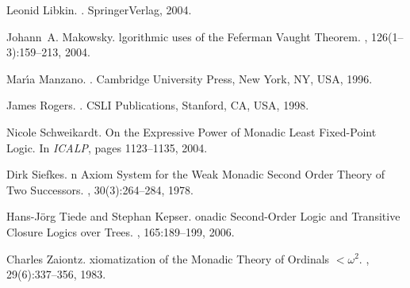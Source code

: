 \documentclass{LMCS}
\begin{document}
\begin{thebibliography}{10}
Leonid Libkin.
.
\newblock SpringerVerlag, 2004.

Johann~A. Makowsky.
lgorithmic uses of the {F}eferman {V}aught {T}heorem.
, 126(1--3):159--213, 2004.

Mar\'{\i}a Manzano.
.
\newblock Cambridge University Press, New York, NY, USA, 1996.

James Rogers.
.
\newblock CSLI Publications, Stanford, CA, USA, 1998.

Nicole Schweikardt.
\newblock On the {E}xpressive {P}ower of {M}onadic {L}east {F}ixed-{P}oint
  {L}ogic.
\newblock In {\em ICALP}, pages 1123--1135, 2004.

Dirk Siefkes.
n {A}xiom {S}ystem for the {W}eak {M}onadic {S}econd {O}rder
  {T}heory of {T}wo {S}uccessors.
, 30(3):264--284, 1978.

Hans-J\"{o}rg Tiede and Stephan Kepser.
onadic {S}econd-{O}rder {L}ogic and {T}ransitive {C}losure
  {L}ogics over {T}rees.
, 165:189--199, 2006.

Charles Zaiontz.
xiomatization of the {M}onadic {T}heory of {O}rdinals $<\omega^2$.
, 29(6):337--356, 1983.



\end{thebibliography}
\end{document}
